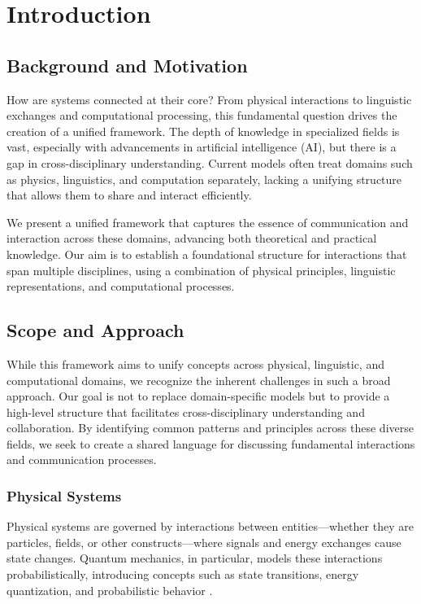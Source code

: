 \section{Introduction}

\subsection{Background and Motivation}

How are systems connected at their core? From physical interactions to linguistic exchanges and computational processing, this fundamental question drives the creation of a unified framework. The depth of knowledge in specialized fields is vast, especially with advancements in artificial intelligence (AI), but there is a gap in cross-disciplinary understanding. Current models often treat domains such as physics, linguistics, and computation separately, lacking a unifying structure that allows them to share and interact efficiently.

We present a unified framework that captures the essence of communication and interaction across these domains, advancing both theoretical and practical knowledge. Our aim is to establish a foundational structure for interactions that span multiple disciplines, using a combination of physical principles, linguistic representations, and computational processes.

\subsection{Scope and Approach}

While this framework aims to unify concepts across physical, linguistic, and computational domains, we recognize the inherent challenges in such a broad approach. Our goal is not to replace domain-specific models but to provide a high-level structure that facilitates cross-disciplinary understanding and collaboration. By identifying common patterns and principles across these diverse fields, we seek to create a shared language for discussing fundamental interactions and communication processes.

\subsubsection{Physical Systems}

Physical systems are governed by interactions between entities—whether they are particles, fields, or other constructs—where signals and energy exchanges cause state changes. Quantum mechanics, in particular, models these interactions probabilistically, introducing concepts such as state transitions, energy quantization, and probabilistic behavior \cite{quantum_mechanics_reference}.

